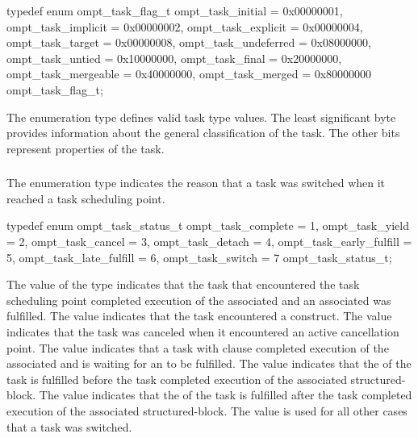 \format
\begin{ccppspecific}
\begin{omptEnum}
typedef enum ompt_task_flag_t {
  ompt_task_initial                   = 0x00000001,
  ompt_task_implicit                  = 0x00000002,
  ompt_task_explicit                  = 0x00000004,
  ompt_task_target                    = 0x00000008,
  ompt_task_undeferred                = 0x08000000,
  ompt_task_untied                    = 0x10000000,
  ompt_task_final                     = 0x20000000,
  ompt_task_mergeable                 = 0x40000000,
  ompt_task_merged                    = 0x80000000
} ompt_task_flag_t;
\end{omptEnum}
\end{ccppspecific}

\descr
The  enumeration type defines valid task type values.
The least significant byte provides information about the general classification 
of the task. The other bits represent properties of the task.




\subsubsection{}
\label{sec:ompt_task_status_t}

\summary
The  enumeration type indicates the reason 
that a task was switched when it reached a task scheduling point.

\format
\begin{ccppspecific}
\begin{omptEnum}
typedef enum ompt_task_status_t {
  ompt_task_complete      = 1,
  ompt_task_yield         = 2,
  ompt_task_cancel        = 3,
  ompt_task_detach        = 4,
  ompt_task_early_fulfill = 5,
  ompt_task_late_fulfill  = 6,
  ompt_task_switch        = 7
} ompt_task_status_t;
\end{omptEnum}
\end{ccppspecific}

\descr
The value  of the  type  indicates 
that the task that encountered the task scheduling point completed execution of the 
associated  and an associated 
was fulfilled. 
The value  indicates that the task encountered a  
construct. 
The value  indicates that the task was canceled when it 
encountered an active cancellation point. 
The value  indicates that a task with  clause 
completed execution of the associated  and is waiting for 
an  to be fulfilled. 
The value  indicates that the 
 of the task is fulfilled before the task
completed execution of the associated structured-block.
The value  indicates that the 
 of the task is fulfilled after the task
completed execution of the associated structured-block.
The value  is used for all other cases that a task was switched.

